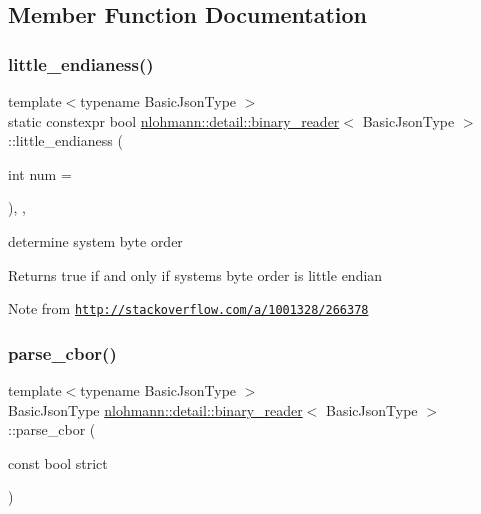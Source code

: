 \subsection{Member Function Documentation}
\mbox{\label{classnlohmann_1_1detail_1_1binary__reader_a1d8f70f95d241354f86a0b9ae711c1c3}} 
\subsubsection{\texorpdfstring{little\+\_\+endianess()}{little\_endianess()}}
{\footnotesize\ttfamily template$<$typename Basic\+Json\+Type $>$ \\
static constexpr bool \hyperlink{classnlohmann_1_1detail_1_1binary__reader}{nlohmann\+::detail\+::binary\+\_\+reader}$<$ Basic\+Json\+Type $>$\+::little\+\_\+endianess (\begin{DoxyParamCaption}\item[{int}]{num = {} }\end{DoxyParamCaption})\hspace{0.3cm}{\ttfamily [inline]}, {\ttfamily [static]}, {\ttfamily [noexcept]}}



determine system byte order 

\begin{DoxyReturn}{Returns}
true if and only if system\textquotesingle{}s byte order is little endian
\end{DoxyReturn}
\begin{DoxyNote}{Note}
from \href{http://stackoverflow.com/a/1001328/266378}{\tt http\+://stackoverflow.\+com/a/1001328/266378} 
\end{DoxyNote}
\mbox{\label{classnlohmann_1_1detail_1_1binary__reader_a04bcdc8f55b26fafa9775a2f89e48fc2}} 
\subsubsection{\texorpdfstring{parse\+\_\+cbor()}{parse\_cbor()}}
{\footnotesize\ttfamily template$<$typename Basic\+Json\+Type $>$ \\
Basic\+Json\+Type \hyperlink{classnlohmann_1_1detail_1_1binary__reader}{nlohmann\+::detail\+::binary\+\_\+reader}$<$ Basic\+Json\+Type $>$\+::parse\+\_\+cbor (\begin{DoxyParamCaption}\item[{const bool}]{strict }\end{DoxyParamCaption})\hspace{0.3cm}{\ttfamily [inline]}}



